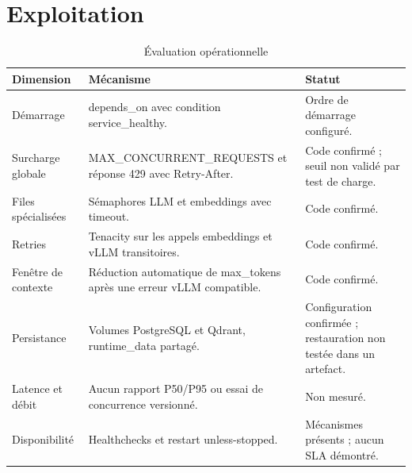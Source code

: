 \section{Exploitation}
\begin{table}[H]
\centering
\caption{Évaluation opérationnelle}
\label{tab:ops_eval_ch7}
\begin{tabular}{p{3.0cm}p{6.0cm}p{4.5cm}}
\toprule
\textbf{Dimension} & \textbf{Mécanisme} & \textbf{Statut} \\
\midrule
Démarrage & depends\_on avec condition service\_healthy. & Ordre de démarrage configuré. \\
Surcharge globale & MAX\_CONCURRENT\_REQUESTS et réponse 429 avec Retry-After. & Code confirmé ; seuil non validé par test de charge. \\
Files spécialisées & Sémaphores LLM et embeddings avec timeout. & Code confirmé. \\
Retries & Tenacity sur les appels embeddings et vLLM transitoires. & Code confirmé. \\
Fenêtre de contexte & Réduction automatique de max\_tokens après une erreur vLLM compatible. & Code confirmé. \\
Persistance & Volumes PostgreSQL et Qdrant, runtime\_data partagé. & Configuration confirmée ; restauration non testée dans un artefact. \\
Latence et débit & Aucun rapport P50/P95 ou essai de concurrence versionné. & Non mesuré. \\
Disponibilité & Healthchecks et restart unless-stopped. & Mécanismes présents ; aucun SLA démontré. \\
\bottomrule
\end{tabular}
\end{table}
